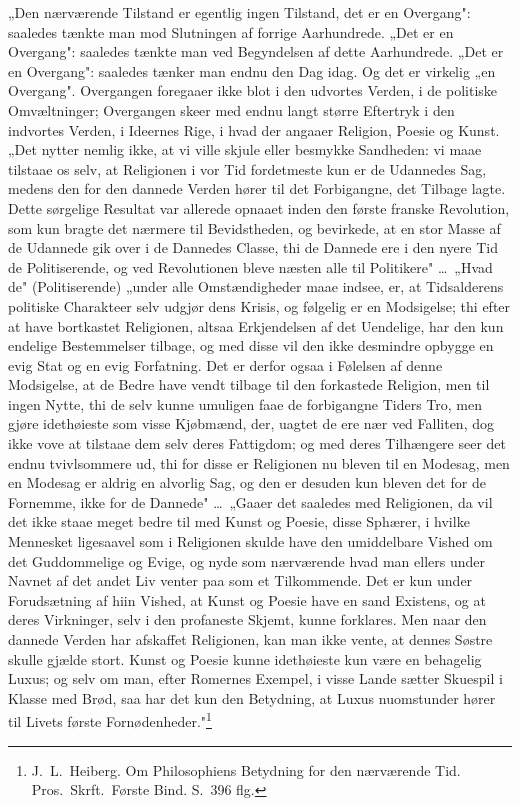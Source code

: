\documentclass[12pt]{book}
\begin{document}
„Den nærværende Tilstand er egentlig ingen Tilstand, det er en Overgang":
saaledes tænkte man mod Slutningen af forrige Aarhundrede. „Det er en Overgang":
saaledes tænkte man ved Begyndelsen af dette Aarhundrede. „Det er en Overgang":
saaledes tænker man endnu den Dag idag. Og det er virkelig „en Overgang".
Overgangen foregaaer ikke blot i den udvortes Verden, i de politiske
Omvæltninger; Overgangen skeer med endnu langt større Eftertryk i den indvortes
Verden, i Ideernes Rige, i hvad der angaaer Religion, Poesie og Kunst. „Det
nytter nemlig ikke, at vi ville skjule eller besmykke Sandheden: vi maae tilstaae
os selv, at Religionen i vor Tid fordetmeste kun er de Udannedes Sag, medens den
for den dannede Verden hører til det Forbigangne, det Tilbage%
lagte. Dette sørgelige Resultat var allerede opnaaet inden den første franske
Revolution, som kun bragte det nærmere til Bevidstheden, og bevirkede, at en stor
Masse af de Udannede gik over i de Dannedes Classe, thi de Dannede ere i den
nyere Tid de Politiserende, og ved Revolutionen bleve næsten alle til Politikere"
\dots\ „Hvad de" (Politiserende) „under alle Omstændigheder maae indsee, er, at
Tidsalderens politiske Charakteer selv udgjør dens Krisis, og følgelig er en
Modsigelse; thi efter at have bortkastet Religionen, altsaa Erkjendelsen af det
Uendelige, har den kun endelige Bestemmelser tilbage, og med disse vil den ikke
desmindre opbygge en evig Stat og en evig Forfatning. Det er derfor ogsaa i
Følelsen af denne Modsigelse, at de Bedre have vendt tilbage til den forkastede
Religion, men til ingen Nytte, thi de selv kunne umuligen faae de forbigangne
Tiders Tro, men gjøre idethøieste som visse Kjøbmænd, der, uagtet de ere nær ved
Falliten, dog ikke vove at tilstaae dem selv deres Fattigdom; og med deres
Tilhængere seer det endnu tvivlsommere ud, thi for disse er Religionen nu bleven
til en Modesag, men en Modesag er aldrig en alvorlig Sag, og den er desuden kun
bleven det for de Fornemme, ikke for de Dannede" \dots\ „Gaaer det saaledes med
Religionen, da vil det ikke staae meget bedre til med Kunst og Poesie, disse
Sphærer, i hvilke Mennesket ligesaavel som i Religionen skulde have den
umiddelbare Vished om det Guddommelige og Evige, og nyde som nærværende hvad man
ellers under Navnet af det andet Liv venter paa som et Tilkommende. Det er kun
under Forudsætning af hiin Vished, at Kunst og Poesie have en sand Existens, og
at deres Virkninger, selv i den profaneste Skjemt, kunne forklares. Men naar den
dannede Verden har afskaffet Religionen, kan man ikke vente, at dennes Søstre
skulle gjælde stort. Kunst og Poesie kunne idethøieste kun være en behagelig
Luxus; og selv om man, efter Romernes Exempel, i visse Lande sætter Skuespil i
Klasse med Brød, saa har det kun den Betydning, at Luxus nuomstunder hører til
Livets første Fornødenheder."\footnote{J.\ L.\ Heiberg. Om Philosophiens Betydning
for den nærværende Tid. Pros.\ Skrft.\ Første Bind. S.~396 flg.}
\end{document}
